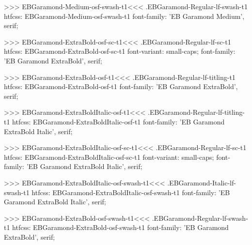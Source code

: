 {{{{{{{>>>
\<EBGaramond-Medium-osf-swash-t1\><<<
.EBGaramond-Regular-lf-swash-t1
htfcss:  EBGaramond-Medium-osf-swash-t1  font-family: 'EB Garamond Medium', serif;

>>>
\<EBGaramond-ExtraBold-osf-sc-t1\><<<
.EBGaramond-Regular-lf-sc-t1
htfcss:  EBGaramond-ExtraBold-osf-sc-t1  font-variant: small-caps; font-family: 'EB Garamond ExtraBold', serif;

>>>
\<EBGaramond-ExtraBold-osf-t1\><<<
.EBGaramond-Regular-lf-titling-t1
htfcss:  EBGaramond-ExtraBold-osf-t1  font-family: 'EB Garamond ExtraBold', serif;

>>>
\<EBGaramond-ExtraBoldItalic-osf-t1\><<<
.EBGaramond-Regular-lf-titling-t1
htfcss:  EBGaramond-ExtraBoldItalic-osf-t1  font-family: 'EB Garamond ExtraBold Italic', serif;

>>>
\<EBGaramond-ExtraBoldItalic-osf-sc-t1\><<<
.EBGaramond-Regular-lf-sc-t1
htfcss:  EBGaramond-ExtraBoldItalic-osf-sc-t1  font-variant: small-caps; font-family: 'EB Garamond ExtraBold Italic', serif;

>>>
\<EBGaramond-ExtraBoldItalic-osf-swash-t1\><<<
.EBGaramond-Italic-lf-swash-t1
htfcss:  EBGaramond-ExtraBoldItalic-osf-swash-t1  font-family: 'EB Garamond ExtraBold Italic', serif;

>>>
\<EBGaramond-ExtraBold-osf-swash-t1\><<<
.EBGaramond-Regular-lf-swash-t1
htfcss:  EBGaramond-ExtraBold-osf-swash-t1  font-family: 'EB Garamond ExtraBold', serif;

}}}}}}}
